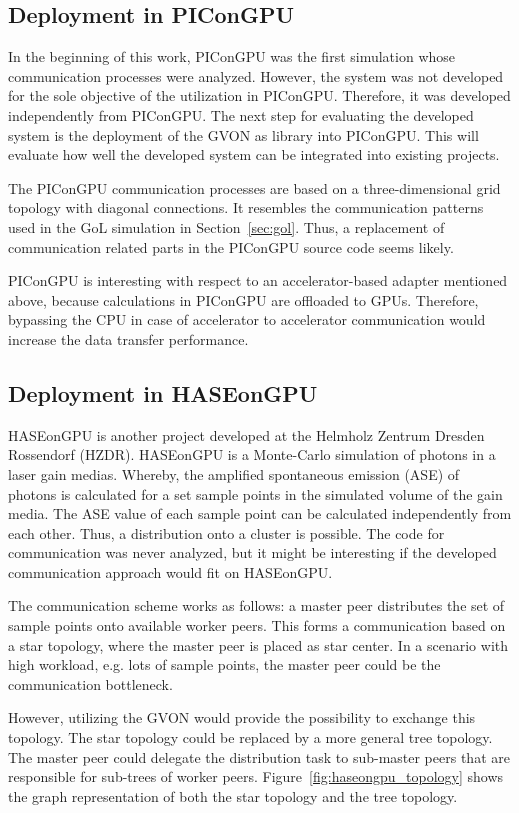 \subsection*{Deployment in PIConGPU}
In the beginning of this work, PIConGPU was the first simulation whose
communication processes were analyzed. However, the system was not
developed for the sole objective of the utilization in
PIConGPU. Therefore, it was developed independently from PIConGPU.
The next step for evaluating the developed system is the deployment of
the GVON as library into PIConGPU. This will evaluate how well the
developed system can be integrated into existing projects.

The PIConGPU communication processes are based on a three-dimensional
grid topology with diagonal connections. It resembles the
communication patterns used in the GoL simulation in Section~\ref{sec:gol}. Thus, a replacement
of communication related parts in the PIConGPU source code seems likely.

PIConGPU is interesting with respect to an accelerator-based adapter
mentioned above, because calculations in PIConGPU are offloaded to
GPUs. Therefore, bypassing the CPU in case of accelerator to
accelerator communication would increase the data transfer
performance.

\subsection*{Deployment in HASEonGPU}
HASEonGPU is another project developed at the Helmholz Zentrum Dresden
Rossendorf (HZDR). HASEonGPU is a Monte-Carlo simulation of photons in
a laser gain medias. Whereby, the amplified spontaneous emission (ASE)
of photons is calculated for a set sample points in the simulated
volume of the gain media. The ASE value of each sample point can be
calculated independently from each other. Thus, a distribution onto a
cluster is possible.  The code for communication was never analyzed,
but it might be interesting if the developed communication approach
would fit on HASEonGPU.

The communication scheme works as follows: a master peer distributes the set of sample points onto
available worker peers. This forms a communication based on a
star topology, where the master peer is placed as star center. In a
scenario with high workload, e.g. lots of sample points, the
master peer could be the communication bottleneck.

However, utilizing the GVON would provide the possibility to exchange this
topology. The star topology could be replaced by a more general tree
topology. The master peer could delegate the distribution task to
sub-master peers that are responsible for sub-trees of worker peers.
Figure~\ref{fig:haseongpu_topology} shows the graph representation of
both the star topology and the tree topology. 

